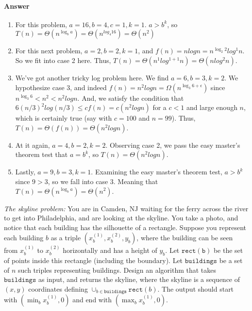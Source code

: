 \documentclass{article}
\begin{document}
\paragraph{Answer}


\begin{enumerate}
	\item
		For this problem, $a=16, b=4, c=1, k=1$. $a>b^k$, so $T(n)=
		\Theta(n^{\log_{b} a}) = \Theta(n^{log_{4} 16}) = \Theta(n^2)$
	\item
		For this next problem, $a=2, b= 2, k=1$, and $f(n) = nlogn = 
		n^{\log_{2} 2}log^1n$. So we fit into case 2 here. 
		Thus, $T(n) = \Theta(n^1log^{1+1}n) =\Theta(nlog^2n)$.
	\item
		We've got another tricky log problem here. We find $a = 6,
		b=3, k = 2$. We hypothesize case 3, and indeed $f(n) = n^2logn
		= \Omega(n^{\log_{3} 6 + \epsilon})$ since $n^{\log_{3} 6 }< 
		n^2 < n^2logn$. And, we satisfy the condition that $6(n/3)^2
		log(n/3) \leq
		cf(n) = c(n^2logn)$ for a $c<1$ and large enough $n$, 
		which is certainly true (say with $c = 100$ and $n = 99$).
		Thus, $T(n) = \Theta(f(n)) = \Theta(n^2logn)$.
	\item
		At it again, $a = 4, b = 2, k = 2$. Observing case 2, we
		pass the easy master's theorem test that $a = b^k$, so
		$T(n) = \Theta(n^2logn)$.
	\item
		Lastly, $a = 9, b = 3, k = 1$. Examining the easy master's
		theorem test, $a > b^k$ since $9 > 3$, so we fall into case 3.
		Meaning that $T(n) = \Theta(n^{\log_{b}a}) = \Theta(n^2)$.
\end{enumerate}


\nextprob
{}

\emph{The skyline problem:} You are in Camden, NJ waiting for the ferry across the river to
get into Philadelphia, and are looking at the skyline.  You take a photo, and notice that each building
has the silhouette of a rectangle.  Suppose you  represent each building $b$ as a
triple $(x_b^{(1)},x_b^{(2)},y_b)$, where the building can be seen from $x_b^{(1)}$ to $x_b^{(2)}$
horizontally and has a height of $y_b$.  Let $\mathtt{rect(b)}$ be the set of
points inside this rectangle (including the boundary).  Let $\mathtt{buildings}$
be a set of $n$ such triples representing buildings. Design an algorithm that takes $\mathtt{buildings}$ as input, and
returns the skyline, where the skyline is a sequence of~$(x,y)$ coordinates
defining $\cup_{b \in \mathtt{buildings}} \mathtt{rect}(b)$.  The output should
start with $(\min_b{x_b^{(1)}},0)$ and end with $(\max_b{x_b^{(1)}},0)$.
\end{document}

